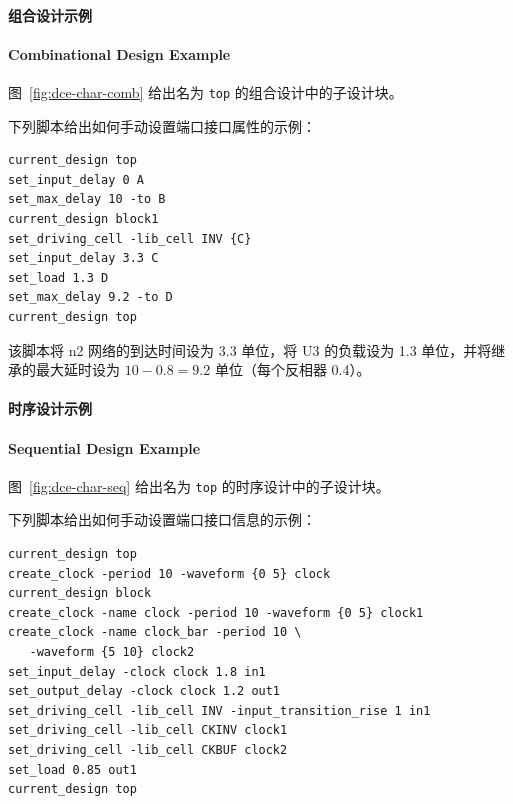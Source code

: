 \paragraph{组合设计示例}
\paragraph*{Combinational Design Example}

图~\ref{fig:dce-char-comb} 给出名为 \texttt{top} 的组合设计中的子设计块。


下列脚本给出如何手动设置端口接口属性的示例：
\begin{lstlisting}
current_design top
set_input_delay 0 A
set_max_delay 10 -to B
current_design block1
set_driving_cell -lib_cell INV {C}
set_input_delay 3.3 C
set_load 1.3 D
set_max_delay 9.2 -to D
current_design top
\end{lstlisting}

该脚本将 n2 网络的到达时间设为 3.3 单位，将 U3 的负载设为 1.3 单位，并将继承的最大延时设为 $10 - 0.8 = 9.2$ 单位（每个反相器 0.4）。

\paragraph{时序设计示例}
\paragraph*{Sequential Design Example}

图~\ref{fig:dce-char-seq} 给出名为 \texttt{top} 的时序设计中的子设计块。


下列脚本给出如何手动设置端口接口信息的示例：
\begin{lstlisting}
current_design top
create_clock -period 10 -waveform {0 5} clock
current_design block
create_clock -name clock -period 10 -waveform {0 5} clock1
create_clock -name clock_bar -period 10 \
   -waveform {5 10} clock2
set_input_delay -clock clock 1.8 in1
set_output_delay -clock clock 1.2 out1
set_driving_cell -lib_cell INV -input_transition_rise 1 in1
set_driving_cell -lib_cell CKINV clock1
set_driving_cell -lib_cell CKBUF clock2
set_load 0.85 out1
current_design top
\end{lstlisting}

